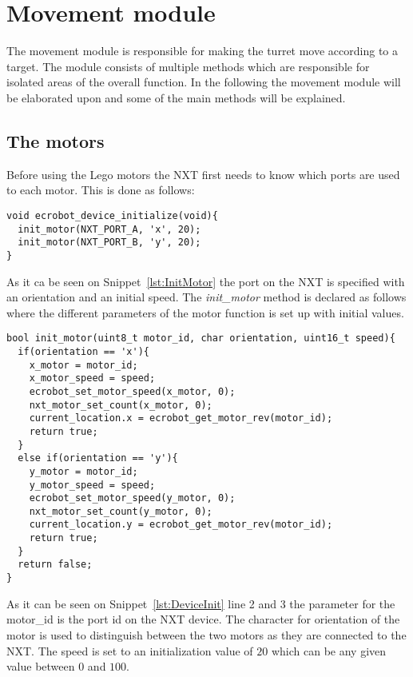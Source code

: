 \section{Movement module}
The movement module is responsible for making the turret move according to a target.
The module consists of multiple methods which are responsible for isolated areas of the overall function. 
In the following the movement module will be elaborated upon and some of the main methods will be explained. 

\subsection{The motors}
Before using the Lego motors the NXT first needs to know which ports are used to each motor. 
This is done as follows:
\begin{lstlisting}[language=CSharp, label={lst:DeviceInit},caption={ecrobot\_device\_initialize method from movement.c}]
void ecrobot_device_initialize(void){
  init_motor(NXT_PORT_A, 'x', 20);
  init_motor(NXT_PORT_B, 'y', 20);
}
\end{lstlisting}
As it ca be seen on Snippet~\ref{lst:InitMotor} the port on the NXT is specified with an orientation and an initial speed.
The \textit{init\_motor} method is declared as follows where the different parameters of the motor function is set up with initial values.

\begin{lstlisting}[language=CSharp,label={lst:InitMotor},caption={init\_motor method from movement.c}]
bool init_motor(uint8_t motor_id, char orientation, uint16_t speed){
  if(orientation == 'x'){
    x_motor = motor_id;
    x_motor_speed = speed;
    ecrobot_set_motor_speed(x_motor, 0);
    nxt_motor_set_count(x_motor, 0);
    current_location.x = ecrobot_get_motor_rev(motor_id);
    return true;
  }
  else if(orientation == 'y'){
    y_motor = motor_id;
    y_motor_speed = speed;
    ecrobot_set_motor_speed(y_motor, 0);
    nxt_motor_set_count(y_motor, 0);
    current_location.y = ecrobot_get_motor_rev(motor_id);
    return true;
  }
  return false;
}
\end{lstlisting}
As it can be seen on Snippet~\ref{lst:DeviceInit} line 2 and 3 the parameter for the motor\_id is the port id on the NXT device. 
The character for orientation of the motor is used to distinguish between the two motors as they are connected to the NXT.
The speed is set to an initialization value of $20$ which can be any given value between $0$ and $100$.

